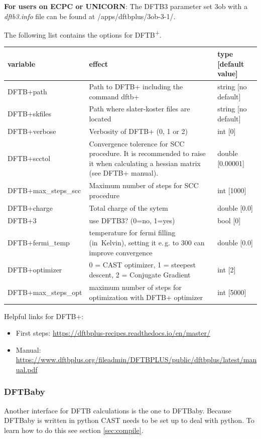 \documentclass[10pt,a4paper]{article} %
\begin{document}
\textbf{For users on ECPC or UNICORN}: The DFTB3 parameter set 3ob with a \textit{dftb3.info} file can be found at /apps/dftbplus/3ob-3-1/.


The following list contains the options for DFTB\textsuperscript{+}. 

		\begin{longtable}{|p{3.5cm}|p{5cm}|p{3cm}|}
		variable & effect & type [default value] \\
		\hline
			DFTB+path  & Path to DFTB+ including the command dftb+ & string [no default]\\
			DFTB+skfiles  & Path where slater-koster files are located & string [no default]\\
			DFTB+verbose & Verbosity of DFTB+ (0, 1 or 2) & int [0]\\
			DFTB+scctol & Convergence tolerence for SCC procedure. It is recommended to raise it when calculating a hessian matrix (see DFTB+ manual). & double [0.00001]\\
      DFTB+max\_steps\_scc & Maximum number of steps for SCC procedure & int [1000]\\
			DFTB+charge & Total charge of the sytem & double [0.0] \\
			DFTB+3 & use DFTB3? (0=no, 1=yes) & bool [0] \\
			DFTB+fermi\_temp & temperature for fermi filling \mbox{(in Kelvin)}, setting it e.\,g. to 300 can improve convergence & double [0.0] \\
			DFTB+optimizer & 0 = CAST optimizer, 1 = steepest descent, 2 = Conjugate Gradient & int [2] \\
			DFTB+max\_steps\_opt & maximum number of steps for optimization with DFTB+ optimizer & int [5000] \\
		\end{longtable}
		
Helpful links for DFTB+:
\begin{itemize}
\item First steps: \url{https://dftbplus-recipes.readthedocs.io/en/master/}
\item Manual: \url{https://www.dftbplus.org/fileadmin/DFTBPLUS/public/dftbplus/latest/manual.pdf}
\end{itemize}


\subsubsection{DFTBaby} \label{sec:DFTB}

Another interface for DFTB calculations is the one to DFTBaby\supercite{noauthor_dftbaby_nodate}. Because DFTBaby is written in python CAST needs to be set up to deal with python. To learn how to do this see section \ref{sec:compile}.
\end{document}
